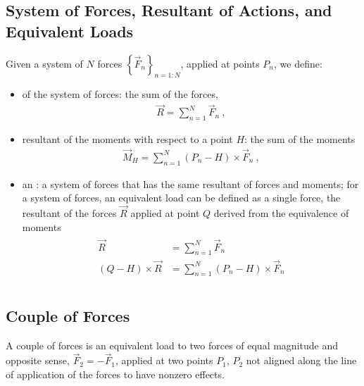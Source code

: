 \documentclass[letterpaper,10pt,english]{jupyterBook}
\begin{document}
\subsection{System of Forces, Resultant of Actions, and Equivalent Loads}
\label{\detokenize{ch/actions-types:system-of-forces-resultant-of-actions-and-equivalent-loads}}
\sphinxAtStartPar
Given a system of \(N\) forces \(\left\{ \vec{F}_n \right\}_{n=1:N}\), applied at points \(P_n\), we define:
\begin{itemize}
\item {} 
\sphinxAtStartPar
{} of the system of forces: the sum of the forces,
\begin{equation*}
\begin{split}\vec{R} = \sum_{n=1}^{N} \vec{F}_n \ ,\end{split}
\end{equation*}
\item {} 
\sphinxAtStartPar
resultant of the moments with respect to a point \(H\): the sum of the moments
\begin{equation*}
\begin{split}\vec{M}_H = \sum_{n=1}^{N} (P_n - H) \times \vec{F}_n \ ,\end{split}
\end{equation*}
\item {} 
\sphinxAtStartPar
an : a system of forces that has the same resultant of forces and moments; for a system of forces, an equivalent load can be defined as a single force, the resultant of the forces \(\vec{R}\) applied at point \(Q\) derived from the equivalence of moments
\begin{equation*}
\begin{split}\begin{aligned}
    \vec{R} & = \sum_{n=1}^{N} \vec{F}_n \\
    (Q - H) \times \vec{R} & = \sum_{n=1}^{N} (P_n - H) \times \vec{F}_n \\
  \end{aligned}\end{split}
\end{equation*}
\end{itemize}


\subsection{Couple of Forces}
\label{\detokenize{ch/actions-types:couple-of-forces}}
\sphinxAtStartPar
A couple of forces is an equivalent load to two forces of equal magnitude and opposite sense, \(\vec{F}_2 = - \vec{F}_1\), applied at two points \(P_1\), \(P_2\) not aligned along the line of application of the forces to have non\sphinxhyphen{}zero effects.
\end{document}
